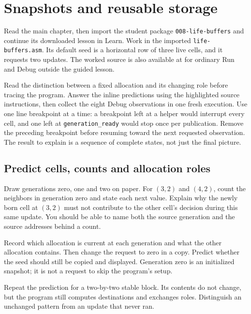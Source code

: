 \chapter{Snapshots and reusable storage}
\label{revision-lab:state-and-buffers}

Read the main chapter, then import the student package
\texttt{008-life-buffers} and continue its downloaded lesson in Learn. Work in
the imported \texttt{life-buffers.asm}. Its default seed is a horizontal row of
three live cells, and it requests two updates. The worked source is also available
at  for ordinary Run and Debug outside
the guided lesson.

Read the distinction between a fixed allocation and its changing role before
tracing the program. Answer the inline predictions using the highlighted source
instructions, then collect the eight Debug observations in one fresh execution.
Use one line breakpoint at a time: a breakpoint left at a helper would interrupt
every cell, and one left at \texttt{generation\_ready} would stop once per
publication. Remove the preceding breakpoint before resuming toward the next
requested observation. The result to explain is a sequence of complete states,
not just the final picture.

\section{Predict cells, counts and allocation roles}

Draw generations zero, one and two on paper. For $(3,2)$ and $(4,2)$, count the
neighbors in generation zero and state each next value. Explain why the newly
born cell at $(3,2)$ must not contribute to the other cell's decision during this
same update. You should be able to name both the source generation and the source
addresses behind a count.

Record which allocation is current at each generation and what the other allocation
contains. Then change the request to zero in a copy. Predict whether the seed should
still be copied and displayed. Generation zero is an initialized snapshot; it is
not a request to skip the program's setup.

Repeat the prediction for a two-by-two stable block. Its contents do not change,
but the program still computes destinations and exchanges roles. Distinguish an
unchanged pattern from an update that never ran.

